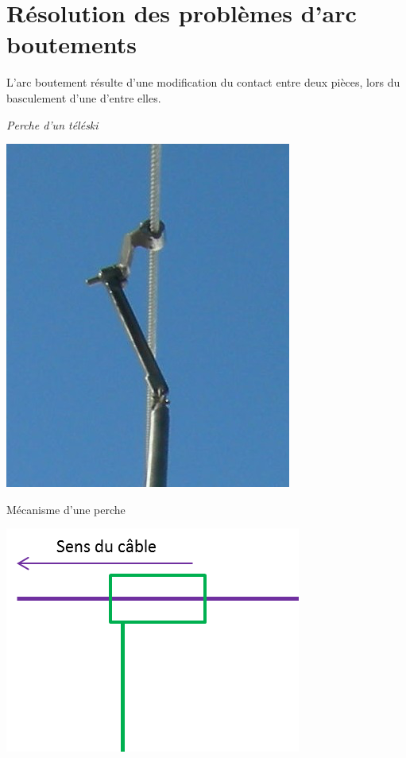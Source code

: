 \documentclass[11pt,oneside]{article}
\begin{document}
\section{Résolution des problèmes d'arc boutements}
L'arc boutement résulte d'une modification du contact entre deux pièces, lors du basculement d'une d'entre elles. 
\begin{exemple}
\textit{Perche d'un téléski}

\begin{center}
\begin{minipage}[c]{.3\linewidth}
\begin{center}
\includegraphics[width=.9\textwidth]{png/perche}

Mécanisme d'une perche
\end{center}
\end{minipage}\hfill
\begin{minipage}[c]{.3\linewidth}
\begin{center}
\includegraphics[width=.9\textwidth]{png/arc1}


\end{center}
\end{minipage}
\end{center}
\end{exemple}
\end{document}
